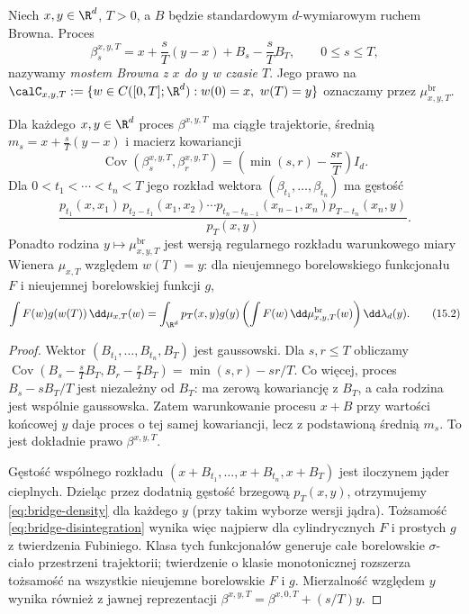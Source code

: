 \begin{definicja}
\label{def:brownian-bridge-path}
Niech $x,y\in\R^d$, $T>0$, a $B$ będzie standardowym
$d$-wymiarowym ruchem Browna. Proces
\[
 \beta_s^{x,y,T}=x+\frac{s}{T}(y-x)+B_s-\frac{s}{T}B_T,
 \qquad 0\le s\le T,
\]
nazywamy \emph{mostem Browna z $x$ do $y$ w czasie $T$}.
Jego prawo na
$\calC_{x,y,T}:=\{w\in C([0,T];\R^d):w(0)=x,\ w(T)=y\}$
oznaczamy przez $\mu_{x,y,T}^{\mathrm{br}}$.
\end{definicja}

\begin{twierdzenie}
\label{th:bridge-conditional}
Dla każdego $x,y\in\R^d$ proces $\beta^{x,y,T}$ ma
ciągłe trajektorie, średnią
$m_s=x+\frac{s}{T}(y-x)$ i macierz kowariancji
\[
\operatorname{Cov}(\beta_s^{x,y,T},\beta_r^{x,y,T})
 =\left(\min(s,r)-\frac{sr}{T}\right)I_d.
\]
Dla $0<t_1<\cdots<t_n<T$ jego rozkład wektora
$(\beta_{t_1},\ldots,\beta_{t_n})$ ma gęstość
\[
\frac{p_{t_1}(x,x_1)\,p_{t_2-t_1}(x_1,x_2)
 \cdots p_{t_n-t_{n-1}}(x_{n-1},x_n)
 p_{T-t_n}(x_n,y)}{p_T(x,y)}.
\tag{15.1}\label{eq:bridge-density}
\]
Ponadto rodzina $y\mapsto\mu_{x,y,T}^{\mathrm{br}}$
jest wersją regularnego rozkładu warunkowego miary Wienera
$\mu_{x,T}$ względem $w(T)=y$: dla nieujemnego borelowskiego
funkcjonału $F$ i nieujemnej borelowskiej funkcji $g$,
\[
 \int F(w)g(w(T))\,\dd\mu_{x,T}(w)
 =\int_{\R^d}p_T(x,y)g(y)
    \left(\int F(w)\,\dd\mu_{x,y,T}^{\mathrm{br}}(w)\right)
    \dd\lambda_d(y).
\tag{15.2}\label{eq:bridge-disintegration}
\]
\end{twierdzenie}
\begin{proof}
Wektor $(B_{t_1},\ldots,B_{t_n},B_T)$ jest gaussowski.
Dla $s,r\le T$ obliczamy
$\operatorname{Cov}(B_s-\frac sT B_T,
B_r-\frac rT B_T)=\min(s,r)-sr/T$.
Co więcej, proces $B_s-sB_T/T$ jest niezależny od $B_T$:
ma zerową kowariancję z $B_T$, a cała rodzina jest wspólnie
gaussowska. Zatem warunkowanie procesu $x+B$ przy wartości
końcowej $y$ daje proces o tej samej kowariancji, lecz z
podstawioną średnią $m_s$. To jest dokładnie prawo
$\beta^{x,y,T}$.

Gęstość wspólnego rozkładu
$(x+B_{t_1},\ldots,x+B_{t_n},x+B_T)$ jest iloczynem
jąder cieplnych. Dzieląc przez dodatnią gęstość brzegową
$p_T(x,y)$, otrzymujemy \eqref{eq:bridge-density} dla
każdego $y$ (przy takim wyborze wersji jądra).
Tożsamość \eqref{eq:bridge-disintegration} wynika więc
najpierw dla cylindrycznych $F$ i prostych $g$ z twierdzenia
Fubiniego. Klasa tych funkcjonałów generuje całe borelowskie
$\sigma$-ciało przestrzeni trajektorii; twierdzenie o klasie
monotonicznej rozszerza tożsamość na wszystkie nieujemne
borelowskie $F$ i $g$. Mierzalność względem $y$ wynika
również z jawnej reprezentacji
$\beta^{x,y,T}=\beta^{x,0,T}+(s/T)y$.
\end{proof}

